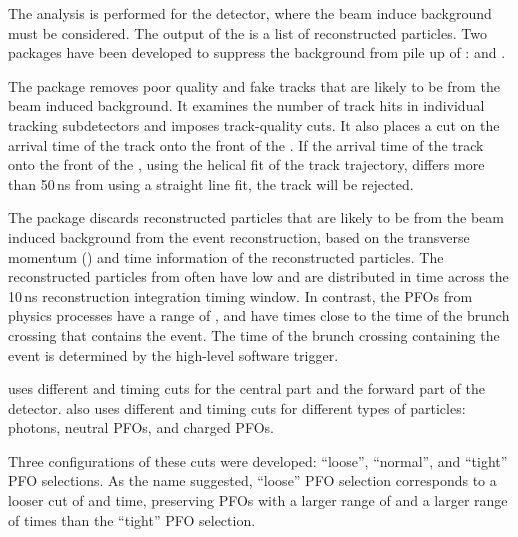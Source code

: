 The analysis   is performed for the \CLICILD detector, where the \CLIC beam induce background must be considered. The output of the \pandora is a list of reconstructed particles. Two packages have been developed to suppress the background from pile up of \ggHad: \TrackSelector and \PFOSelector \cite{Marshall:2012ry}.

The \TrackSelector \cite{Marshall:2012ry} package  removes poor quality and fake tracks that are  likely to be from the beam induced background. It examines the number of track hits in individual tracking subdetectors and imposes track-quality cuts. It also places a cut on the arrival time of the track onto the front of the \ECAL. If the arrival time of the track onto the front of the \ECAL, using the helical fit of the track trajectory, differs more than 50\,ns from using a straight line fit, the track will be rejected.


The \PFOSelector \cite{Marshall:2012ry} package discards reconstructed particles that are likely to be from the beam induced background from the event reconstruction, based on the transverse momentum (\pT) and time information of the  reconstructed particles. The  reconstructed particles from \ggHad often have low \pT and are distributed in time across the 10\,ns reconstruction integration timing window. In contrast, the PFOs from physics processes have a range of \pT, and have times close to the time of the brunch crossing that contains the event. The time of  the brunch crossing containing the event is determined by the high-level software trigger.


 \PFOSelector uses different \pT and timing cuts for the central part  and  the forward part of the detector. \PFOSelector also uses different \pT and timing cuts for different types of particles: photons, neutral PFOs, and charged PFOs.

Three configurations of these cuts were developed: ``loose'', ``normal'', and ``tight'' PFO selections. As the name suggested, ``loose'' PFO selection corresponds to a looser cut of \pT and time, preserving PFOs with a larger range of \pT and a larger range of  times than the ``tight'' PFO selection.

